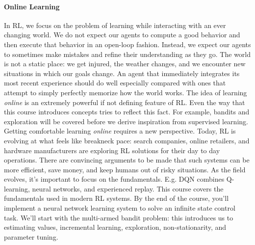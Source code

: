 \documentclass[12pt]{article}
\begin{document}
\paragraph{Online Learning}
In RL, we focus on the problem of learning while interacting with an ever changing world. We do not expect our agents to compute a good behavior and then execute that behavior in an open-loop fashion. Instead, we expect our agents to sometimes make mistakes and refine their understanding as they go. The world is not a static place: we get injured, the weather changes, and we encounter new situations in which our goals change.  An agent that immediately integrates its most recent experience should do well especially compared with ones that attempt to simply perfectly memorize how the world works.
The idea of learning \emph{online} is an extremely powerful if not defining feature of RL. Even the way that this course introduces concepts tries to reflect this fact. For example, bandits and exploration will be covered before we derive inspiration from supervised learning. Getting comfortable learning \emph{online} requires a new perspective. Today, RL is evolving at what feels like breakneck pace: search companies, online retailers, and hardware manufacturers are exploring RL solutions for their day to day operations. There are convincing arguments to be made that such systems can be more efficient, save money, and keep humans out of risky situations. As the field evolves, it's important to focus on the fundamentals. E.g. DQN combines Q-learning, neural networks, and experienced replay. This course covers the fundamentals used in modern RL systems. By the end of the course, you'll implement a neural network learning system to solve an infinite state control task. We'll start with the multi-armed bandit problem: this introduces us to estimating values, incremental learning, exploration, non-stationarity, and parameter tuning.
\end{document}
